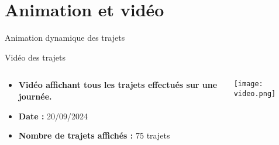 \documentclass[10pt,svgnames,fragile]{beamer}
\begin{document}
\section{Animation et vidéo}
\label{sec:animation}
\begin{frame}[label={sec:animationframe}]{Animation dynamique des trajets}
\begin{block}{Vidéo des trajets}
    \begin{columns} %
        \begin{column}{0.5\textwidth} %
            \begin{itemize}
                \item \textbf{Vidéo affichant tous les trajets effectués sur une journée.}
                \item \textbf{Date :} 20/09/2024
                \item \textbf{Nombre de trajets affichés :} 75 trajets
            \end{itemize}
        \end{column}
        \begin{column}{0.5\textwidth} %
            \begin{center}
                \texttt{[image: video.png]} %
            \end{center}
        \end{column}
    \end{columns}
\end{block}
\end{frame}
\end{document}

